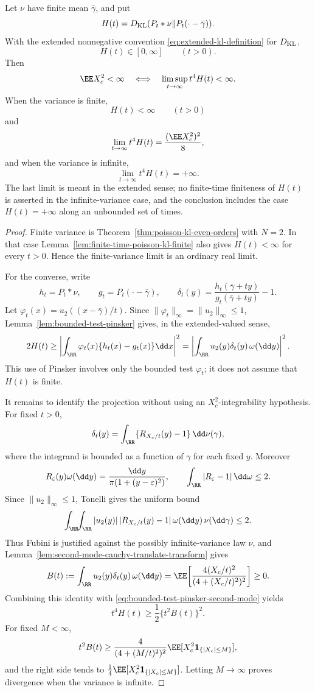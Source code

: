 \begin{theorem}%
\label{thm:sharp-leading-kl-variance-threshold}
Let \(\nu\) have finite mean \(\bar{\gamma}\), and put
\[
H(t)=D_{\rm KL}(P_t*\nu\|P_t(\cdot-\bar{\gamma})).
\]
With the extended nonnegative convention
\eqref{eq:extended-kl-definition} for \(D_{\rm KL}\),
\[
H(t)\in[0,\infty]\qquad(t>0).
\]
Then
\[
\EE X_c^2<\infty
\quad\Longleftrightarrow\quad
\limsup_{t\to\infty}t^4H(t)<\infty .
\]
When the variance is finite,
\[
H(t)<\infty\qquad(t>0)
\]
and
\[
\lim_{t\to\infty}t^4H(t)=\frac{(\EE X_c^2)^2}{8},
\]
and when the variance is infinite,
\[
\lim_{t\to\infty}t^4H(t)=+\infty .
\]
The last limit is meant in the extended sense; no finite-time finiteness of
\(H(t)\) is asserted in the infinite-variance case, and the conclusion
includes the case \(H(t)=+\infty\) along an unbounded set of times.
\end{theorem}

\begin{proof}
Finite variance is Theorem~\ref{thm:poisson-kl-even-orders} with \(N=2\).
In that case Lemma~\ref{lem:finite-time-poisson-kl-finite} also gives
\(H(t)<\infty\) for every \(t>0\).  Hence the finite-variance limit is an
ordinary real limit.

For the converse, write
\[
h_t=P_t*\nu,\qquad g_t=P_t(\cdot-\bar{\gamma}),\qquad
\delta_t(y)=\frac{h_t(\bar{\gamma}+ty)}{g_t(\bar{\gamma}+ty)}-1 .
\]
Let \(\varphi_t(x)=u_2((x-\bar{\gamma})/t)\).  Since
\(\|\varphi_t\|_\infty=\|u_2\|_\infty\le1\),
Lemma~\ref{lem:bounded-test-pinsker} gives, in the
extended-valued sense,
\begin{equation}\label{eq:bounded-test-pinsker-second-mode}
2H(t)\ge
\left|
\int_{\RR}\varphi_t(x)\{h_t(x)-g_t(x)\}\dd x
\right|^2
=
\left|
\int_{\RR}u_2(y)\delta_t(y)\,\omega(\dd y)
\right|^2 .
\end{equation}
This use of Pinsker involves only the bounded test \(\varphi_t\); it does not
assume that \(H(t)\) is finite.

It remains to identify the projection without using an \(X_c^2\)-integrability
hypothesis.  For fixed \(t>0\),
\[
\delta_t(y)=\int_{\RR}\{R_{X_c/t}(y)-1\}\,\dd\nu(\gamma),
\]
where the integrand is bounded as a function of \(\gamma\) for each fixed
\(y\).  Moreover
\[
R_\varepsilon(y)\omega(\dd y)
=\frac{\dd y}{\pi(1+(y-\varepsilon)^2)},
\qquad
\int_{\RR}|R_\varepsilon-1|\,\dd\omega\le2 .
\]
Since \(\|u_2\|_\infty\le1\), Tonelli gives the uniform bound
\[
\int_{\RR}\!\!\int_{\RR}
|u_2(y)|\,|R_{X_c/t}(y)-1|\,\omega(\dd y)\,\nu(\dd\gamma)
\le2 .
\]
Thus Fubini is justified against the possibly infinite-variance law \(\nu\),
and Lemma~\ref{lem:second-mode-cauchy-translate-transform} gives
\[
B(t):=
\int_{\RR}u_2(y)\delta_t(y)\,\omega(\dd y)
=
\EE\!\left[\frac{4(X_c/t)^2}{(4+(X_c/t)^2)^2}\right]\ge0 .
\]
Combining this identity with \eqref{eq:bounded-test-pinsker-second-mode}
yields
\[
t^4H(t)\ge\frac12\{t^2B(t)\}^2 .
\]
For fixed \(M<\infty\),
\[
t^2B(t)\ge
\frac{4}{(4+(M/t)^2)^2}
\EE[X_c^2\mathbf1_{\{|X_c|\le M\}}],
\]
and the right side tends to
\(\frac14\EE[X_c^2\mathbf1_{\{|X_c|\le M\}}]\).  Letting
\(M\to\infty\) proves divergence when the variance is infinite.
\end{proof}

